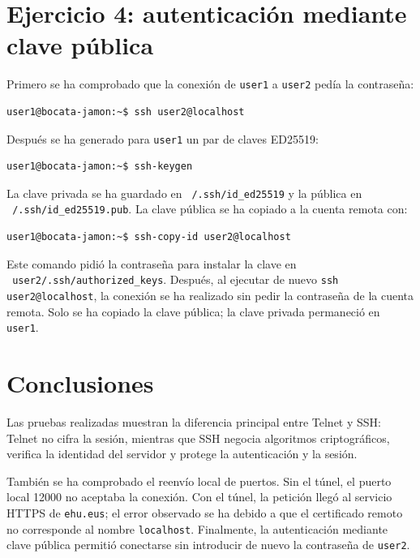 \documentclass[11pt,a4paper]{article}
\begin{document}
\section{Ejercicio 4: autenticación mediante clave pública}
Primero se ha comprobado que la conexión de \texttt{user1} a \texttt{user2} pedía la
contraseña:
\begin{lstlisting}[language=bash]
user1@bocata-jamon:~$ ssh user2@localhost
\end{lstlisting}
Después se ha generado para \texttt{user1} un par de claves ED25519:
\begin{lstlisting}[language=bash]
user1@bocata-jamon:~$ ssh-keygen
\end{lstlisting}
La clave privada se ha guardado en \texttt{~/.ssh/id\_ed25519} y la pública en
\texttt{~/.ssh/id\_ed25519.pub}. La clave pública se ha copiado a la cuenta remota
con:
\begin{lstlisting}[language=bash]
user1@bocata-jamon:~$ ssh-copy-id user2@localhost
\end{lstlisting}
Este comando pidió la contraseña para instalar la clave en
\texttt{~user2/.ssh/authorized\_keys}. Después, al ejecutar de nuevo
\texttt{ssh user2@localhost}, la conexión se ha realizado sin pedir la contraseña de
la cuenta remota. Solo se ha copiado la clave pública; la clave privada permaneció en
\texttt{user1}.

\section{Conclusiones}
Las pruebas realizadas muestran la diferencia principal entre Telnet y SSH:
Telnet no cifra la sesión, mientras que SSH negocia algoritmos criptográficos,
verifica la identidad del servidor y protege la autenticación y la sesión.

También se ha comprobado el reenvío local de puertos. Sin el túnel, el puerto local
12000 no aceptaba la conexión. Con el túnel, la petición llegó al servicio
HTTPS de \texttt{ehu.eus}; el error observado se ha debido a que el certificado
remoto no corresponde al nombre \texttt{localhost}. Finalmente, la
autenticación mediante clave pública permitió conectarse sin introducir de
nuevo la contraseña de \texttt{user2}.
\end{document}
